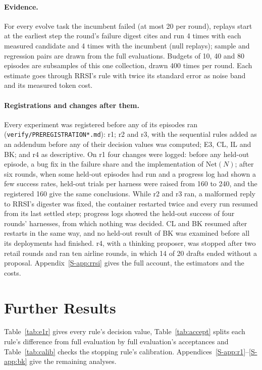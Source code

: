 \documentclass[11pt]{article}
\begin{document}
\paragraph{Evidence.} For every evolve task the incumbent failed (at most 20 per round), replays start at the earliest step the round's failure digest cites and run 4 times with each measured candidate and 4 times with the incumbent (null replays); sample and regression pairs are drawn from the full evaluations. Budgets of 10, 40 and 80 episodes are subsamples of this one collection, drawn 400 times per round. Each estimate goes through RRSI's rule with twice its standard error as noise band and its measured token cost.

\paragraph{Registrations and changes after them.} Every experiment was registered before any of its episodes ran (\texttt{verify/PREREGISTRATION*.md}): r1; r2 and r3, with the sequential rules added as an addendum before any of their decision values was computed; E3, CL, IL and BK; and r4 as descriptive. On r1 four changes were logged: before any held-out episode, a bug fix in the failure share and the implementation of $\mathrm{Net}(N)$; after six rounds, when some held-out episodes had run and a progress log had shown a few success rates, held-out trials per harness were raised from 160 to 240, and the registered 160 give the same conclusions. While r2 and r3 ran, a malformed reply to RRSI's digester was fixed, the container restarted twice and every run resumed from its last settled step; progress logs showed the held-out success of four rounds' harnesses, from which nothing was decided. CL and BK resumed after restarts in the same way, and no held-out result of BK was examined before all its deployments had finished. r4, with a thinking proposer, was stopped after two retail rounds and ran ten airline rounds, in which 14 of 20 drafts ended without a proposal. Appendix~\ref*{S-app:rrsi} gives the full account, the estimators and the costs.

\section{Further Results}
\label{app:results}
Table~\ref{tab:e1r} gives every rule's decision value, Table~\ref{tab:accept} splits each rule's difference from full evaluation by full evaluation's acceptances and Table~\ref{tab:calib} checks the stopping rule's calibration. Appendices~\ref*{S-app:r1}--\ref*{S-app:bk} give the remaining analyses.
\end{document}
